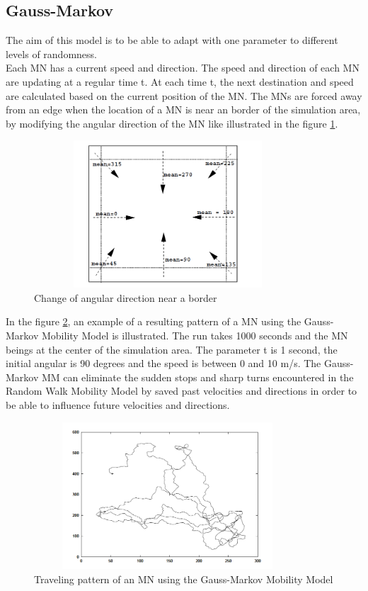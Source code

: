 \newpage
\subsection{Gauss-Markov}

The aim of this model is to be able to adapt with one parameter to different levels of randomness.\\
Each MN has a current speed and direction. The speed and direction of each MN are updating at a regular time t. At each time t, the next destination and speed are calculated based on the current position of the MN. The MNs are forced away from an edge when the location of a MN is near an border of the simulation area, by modifying the angular direction of the MN like illustrated in the figure \ref{Gauss-MarkovFig1}.\\

\begin{figure}[h]
\center
\includegraphics[width=10cm,height=55mm]{../images/gauss-markovmodel1.png}
\caption{\label{Gauss-MarkovFig1} Change of angular direction near a border}
\end{figure}

In the figure \ref{Gauss-MarkovFig2}, an example of a resulting pattern of a MN using the Gauss-Markov Mobility Model is illustrated. The run takes 1000 seconds and the MN beings at the center of the simulation area. The parameter t is 1 second, the initial angular is 90 degrees and the speed is between 0 and 10 m/s. The Gauss-Markov MM can eliminate the sudden stops and sharp turns encountered in the Random Walk Mobility Model by saved past velocities and directions in order to be able to influence future velocities and directions.\\

\begin{figure}[h]
\center
\includegraphics[width=10cm,height=55mm]{../images/gauss-markovmodel2.png}
\caption{\label{Gauss-MarkovFig2} Traveling pattern of an MN using the Gauss-Markov Mobility Model}
\end{figure}

